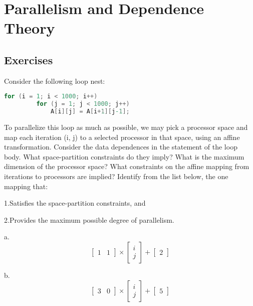 \newpage






\section{Parallelism and Dependence Theory}

\subsection{Exercises}

\begin{problem}
Consider the following loop nest:

\begin{lstlisting}[language=C,frame=single]
	for (i = 1; i < 1000; i++)
         for (j = 1; j < 1000; j++)
             A[i][j] = A[i+1][j-1];
	\end{lstlisting}
To parallelize this loop as much as possible, we may pick a processor space and map each iteration (i, j)
to a selected processor in that space, using an affine transformation. Consider the data dependences in the
statement of the loop body. What space-partition constraints do they imply? What is the maximum dimension of
the processor space? What constraints on the affine mapping from iterations to processors are implied? Identify
from the list below, the one mapping that:

\item 1.Satisfies the space-partition constraints, and
\item 2.Provides the maximum possible degree of parallelism.


\item a.
$$
	\begin{bmatrix}
		1 & 1
	\end{bmatrix}
	\times
	\begin{bmatrix}
		i \\
		j
	\end{bmatrix}
	+
	\begin{bmatrix}
		2
	\end{bmatrix}
$$


\item b.
$$
	\begin{bmatrix}
		3 & 0
	\end{bmatrix}
	\times
	\begin{bmatrix}
		i \\
		j
	\end{bmatrix}
	+
	\begin{bmatrix}
		5
	\end{bmatrix}
$$


\end{problem}
